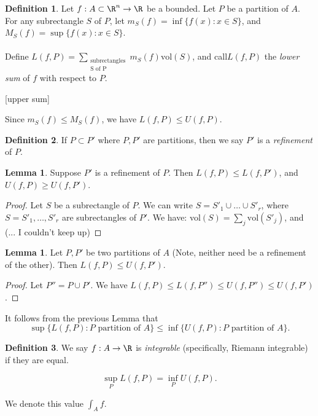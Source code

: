 \documentclass[a5paper]{article}
\theoremstyle{definition}%
\newtheorem{lemma}[theorem]{Lemma}
\newtheorem*{definition*}{Definition}
\numberwithin{exercise}{section}
\theoremstyle{remark}%
\begin{document}
\begin{highlight}
\begin{definition*}
Let $f:A\subset\R^n\to \R$ be a bounded. Let $P$ be a partition of $A$. For any subrectangle $S$ of $P$, let $m_S(f)=\inf\{f(x):x\in S\}$, and $M_S(f)=\sup\{f(x):x\in S\}$. \\
\mbox{}\\
Define $L(f,P)=\sum\limits_{\substack{\text{subrectangles}\\ \text{S of P}}}m_S(f)\text{vol}(S)$, and call$L(f,P)$ the \emph{lower sum} of $f$ with respect to $P$. 

[upper sum]


\end{definition*}
\end{highlight}

Since $m_S(f)\leq M_S(f)$, we have $L(f,P)\leq U(f,P)$. 

\begin{definition*}
If $P\subset P'$ where $P,P'$ are partitions, then we say $P'$ is a \emph{refinement } of $P$. 
\end{definition*}


\begin{lemma}
Suppose $P'$ is a refinement of $P$. Then $L(f,P)\leq L(f,P')$, and $U(f,P)\geq U(f,P')$. 
\end{lemma}
\begin{proof}
Let $S$ be a subrectangle of $P$. We can write $S=S'_1 \cup \dots \cup S'_r$, where $S=S'_1,  \dots, S'_r$ are subrectangles of $P'$. We have: vol$(S) = \sum_j\text{vol}(S'_j)$, and (... I couldn't keep up)
\end{proof}

\begin{lemma}
Let $P,P'$ be two partitions of $A$ (Note, neither need be a refinement of the other). Then $L(f,P)\leq U(f,P')$. 
\end{lemma}
\begin{proof}
Let $P''=P\cup P'$. We have $L(f,P)\leq L(f,P'')\leq U(f,P'')\leq U(f,P')$.
\end{proof}

\pagebreak
\begin{highlight}
It follows from the previous Lemma that $$\sup\{L(f,P):P\text{ partition of }A\}\leq \inf\{U(f,P):P\text{ partition of }A\}.$$

\begin{definition*}
We say $f:A\to \R$ is \emph{integrable} (specifically, Riemann integrable) if they are equal. 

$$\sup_P L(f,P)=\inf_P U(f,P).$$

We denote this value $\int_A f$. 
\end{definition*}
\end{highlight}
\end{document}
